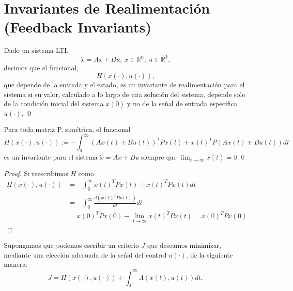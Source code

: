 \section{Invariantes de Realimentación (Feedback Invariants)}
\begin{definition}
Dado un sistema LTI,
\begin{equation*}
\dot{x} =Ax+Bu,\ x \in \mathbb{R}^n,\ u \in \mathbb{R}^k,
\end{equation*}
decimos que el funcional,
\begin{equation*}
H\left(x(\cdot),u(\cdot)\right),
\end{equation*}
que depende de la entrada y el estado, es un invariante de realimentación para el sistema si su valor, calculado a lo largo de una solución del sistema, depende solo de la condición inicial del sistema $x(0)$ y no de la señal de entrada específica $u(\cdot)$.
\qed
\end{definition}

\begin{lemma}
Para toda matriz P, simétrica, el funcional
\begin{equation}\label{eq.fin}
H\left(x(\cdot),u(\cdot)\right):=-\int_0^{\infty}\left(Ax(t)+Bu(t)\right)^TPx(t)+x(t)^TP\left(Ax(t)+Bu(t)\right)dt
\end{equation}
es un invariante para el sistema $\dot{x} = Ax+Bu$ siempre que $\lim_{t\rightarrow \infty} x(t)= 0$
\qed
\end{lemma}
\begin{proof}
Si reescribimos $H$ como
\begin{equation*}
\begin{split}
H\left(x(\cdot),u(\cdot)\right) &= -\int_0^{\infty}\dot{x}(t)^TPx(t)+x(t)^TP\dot{x}(t)dt\\
&= -\int_0^{\infty}\frac{d\left(x(t)^TPx(t)\right)}{dt}dt\\
&=x(0)^TPx(0) -\lim_{t\rightarrow \infty} x(t)^TPx(t) = x(0)^TPx(0)
\end{split}
\end{equation*}
\end{proof}

Supongamos que podemos escribir un criterio $J$ que deseamos minimizar, mediante una elección adecuada de la señal del control $u(\cdot)$, de la siguiente manera:
\begin{equation}\label{eq:jmin}
J = H\left(x(\cdot),u(\cdot)\right) + \int_0^{\infty} \Lambda \left(x(t),u(t)\right)dt,
\end{equation}

